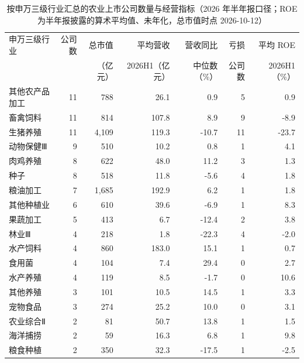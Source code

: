 \begin{table}[htbp]\centering\footnotesize
\caption{按申万三级行业汇总的农业上市公司数量与经营指标（2026 年半年报口径；ROE 为半年报披露的算术平均值、未年化，总市值时点 2026-10-12）}
\label{tab:company-by-industry}
\begin{tabular}{@{}lrrrrrr@{}}
\toprule
申万三级行业 & 公司数 & 总市值 & 平均营收 & 营收同比 & 亏损 & 平均 ROE \\
 & & （亿元） & 2026H1（亿元） & 中位数（\%） & 公司数 & 2026H1（\%） \\
\midrule
其他农产品加工 & 11 & 788 & 26.1 & 0.9 & 5 & 0.9 \\
畜禽饲料 & 11 & 814 & 107.8 & 8.9 & 9 & -8.9 \\
生猪养殖 & 11 & 4,109 & 119.3 & -10.7 & 11 & -23.7 \\
动物保健Ⅲ & 9 & 510 & 10.2 & 0.8 & 1 & 4.1 \\
肉鸡养殖 & 8 & 622 & 48.0 & 11.2 & 3 & 1.3 \\
种子 & 8 & 518 & 11.8 & -5.6 & 4 & 1.8 \\
粮油加工 & 7 & 1,685 & 192.9 & 6.2 & 1 & 1.8 \\
其他种植业 & 6 & 610 & 39.6 & -6.9 & 1 & 8.3 \\
果蔬加工 & 5 & 413 & 6.7 & -12.4 & 2 & 3.8 \\
林业Ⅲ & 4 & 218 & 1.8 & -22.3 & 4 & -2.0 \\
水产饲料 & 4 & 860 & 183.0 & 15.1 & 1 & 0.7 \\
食用菌 & 4 & 104 & 7.4 & 29.4 & 0 & 2.7 \\
水产养殖 & 4 & 119 & 8.5 & -1.7 & 0 & 10.6 \\
其他养殖 & 3 & 101 & 10.5 & 14.5 & 1 & 3.3 \\
宠物食品 & 3 & 274 & 25.2 & 10.0 & 0 & 3.1 \\
农业综合Ⅱ & 2 & 81 & 50.7 & 13.8 & 1 & 1.5 \\
海洋捕捞 & 2 & 59 & 16.3 & 6.8 & 1 & 9.8 \\
粮食种植 & 2 & 350 & 32.3 & -17.5 & 1 & -2.5 \\
\bottomrule
\end{tabular}
\end{table}
